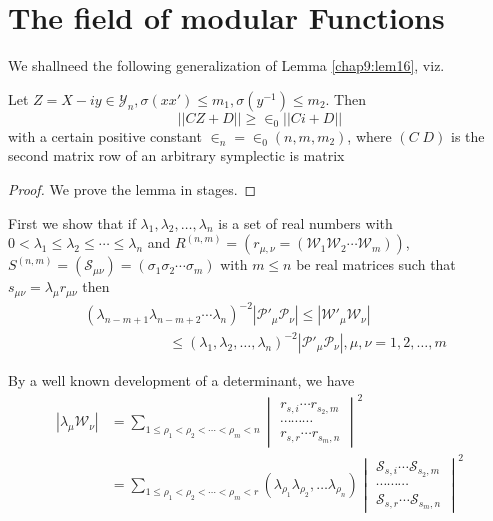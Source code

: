  
\chapter{The field of modular Functions}%

We shall\pageoriginale need the following generalization of Lemma
\ref{chap9:lem16}, viz. 

\setcounter{lem}{16}
\begin{lem}\label{chap12:lem17}%
Let $Z=X-iy \in \mathscr{Y}_n, \sigma(xx') \leq m_1,\sigma(y^{-1})\leq
m_2$. Then 
\begin{equation*}
||CZ + D|| \geq \in_0 || Ci + D||\tag{193}\label{eq193}
\end{equation*}
with a certain positive constant $\in_n = \in_0(n, m, m_2)$,
where $(C \; D)$ is the second matrix row of an arbitrary
  symplectic is matrix 
\end{lem}

\begin{proof}
We prove the lemma in stages.
\end{proof}

First we show that if $\lambda_1, \lambda_2,\ldots, \lambda_n$ is a
set of real numbers with $0 < \lambda_1 \leq \lambda_2 \leq \cdots
\leq \lambda_n$ and $R^{(n, m)}=(r_{\mu, \nu}=(\mathscr{W}_1
\mathscr{W}_2 \cdots \mathscr{W}_m))$, $S^{(n, m)}= (\mathscr{S}_{\mu
  \nu})=(\sigma_1 \sigma_2 \cdots \sigma_m)$ with $m \leq n$ be real
matrices such that $s_{\mu\nu}=\lambda_{\mu} r_{\mu \nu}$ then 
\begin{align*}
& (\lambda_{n-m+1}\lambda_{n-m+2}\cdots \lambda_n)^{-2}|\mathscr{P}'_\mu
  \mathscr{P}_\nu | \leq | \mathscr{W}'_\mu
  \mathscr{W}_\nu|\\ 
& \qquad \qquad \qquad \leq (\lambda_1,
  \lambda_2,\ldots,\lambda_n)^{-2}| \mathscr{P}'_\mu \mathscr{P}_\nu  |, \mu,
  \nu=1,2,\ldots,m   \tag{194}\label{eq194}  
\end{align*}

By a well known development of a determinant, we have
\begin{align*}
|\lambda_\mu \mathscr{W}_\nu | &= \sum_{1 \leq \rho_1< \rho_2 < \cdots
  < \rho_m < n}\begin{vmatrix} r_{s, i} \cdots r_{s_2, m} \\ \cdots
  \cdots \cdots \\ r_{s,r}\cdots r_{s_m,n}\end{vmatrix}^2\\ 
 &=\sum_{1 \leq \rho_1< \rho_2 < \cdots < \rho_m <
  r}(\lambda_{\rho_1}\lambda_{\rho_2},\ldots
\lambda_{\rho_n})\begin{vmatrix} \mathscr{S}_{s, i} \cdots
  \mathscr{S}_{s_2, m} \\ \cdots \cdots \cdots
  \\ \mathscr{S}_{s,r}\cdots \mathscr{S}_{s_m,n}\end{vmatrix}^2\\ 
\end{align*}

